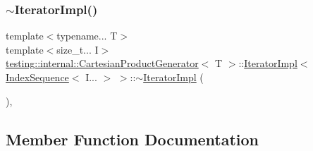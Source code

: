 \subsubsection{\texorpdfstring{$\sim$IteratorImpl()}{~IteratorImpl()}\hspace{0.1cm}{\footnotesize\ttfamily [2/2]}}
{\footnotesize\ttfamily template$<$typename... T$>$ \\
template$<$size\+\_\+t... I$>$ \\
\mbox{\hyperlink{classtesting_1_1internal_1_1_cartesian_product_generator}{testing\+::internal\+::\+Cartesian\+Product\+Generator}}$<$ T $>$\+::\mbox{\hyperlink{classtesting_1_1internal_1_1_cartesian_product_generator_1_1_iterator_impl}{Iterator\+Impl}}$<$ \mbox{\hyperlink{structtesting_1_1internal_1_1_index_sequence}{Index\+Sequence}}$<$ I... $>$ $>$\+::$\sim$\mbox{\hyperlink{classtesting_1_1internal_1_1_cartesian_product_generator_1_1_iterator_impl}{Iterator\+Impl}} (\begin{DoxyParamCaption}{ }\end{DoxyParamCaption})\hspace{0.3cm}{\ttfamily [inline]}, {\ttfamily [override]}}



\subsection{Member Function Documentation}
\mbox{\label{classtesting_1_1internal_1_1_cartesian_product_generator_1_1_iterator_impl_3_01_index_sequence_3_01_i_8_8_8_01_4_01_4_a167e8b38118c8635d5849daf924a517b}} 
